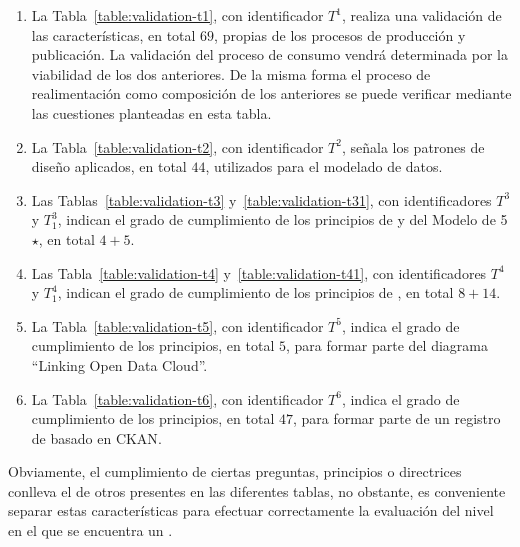 \begin{enumerate}
 \item La Tabla~\ref{table:validation-t1}, con identificador $T^{1}$, realiza una validación de las características, en total $69$, 
propias de los procesos de producción y publicación. La validación del proceso de consumo vendrá
determinada por la viabilidad de los dos anteriores. De la misma forma el proceso de realimentación
como composición de los anteriores se puede verificar mediante las cuestiones planteadas en esta tabla.
\item La Tabla~\ref{table:validation-t2}, con identificador $T^{2}$, señala los patrones de diseño 
aplicados, en total $44$, utilizados para el modelado de datos.
\item Las Tablas~\ref{table:validation-t3} y~\ref{table:validation-t31}, con identificadores $T^{3}$ y $T^{3}_1$, indican el 
grado de cumplimiento de los principios de \linkeddata y del Modelo de 5 $\star$, en total $4+5$.
\item Las Tabla~\ref{table:validation-t4} y~\ref{table:validation-t41}, con identificadores $T^{4}$ y $T^{4}_1$, indican el grado
de cumplimiento de los principios de \opendata, en total $8+14$.
\item La Tabla~\ref{table:validation-t5}, con identificador $T^{5}$, indica el grado de cumplimiento de los principios, en total $5$, para formar parte
del diagrama ``Linking Open Data Cloud''.
\item La Tabla~\ref{table:validation-t6}, con identificador $T^{6}$, indica el grado de cumplimiento de los principios, en total $47$, para formar parte
de un registro de \datasets basado en \gls{CKAN}.
\end{enumerate}

Obviamente, el cumplimiento de ciertas preguntas, principios o directrices conlleva el de 
otros presentes en las diferentes tablas, no obstante, es conveniente separar estas características
para efectuar correctamente la evaluación del nivel en el que se encuentra un \dataset.

